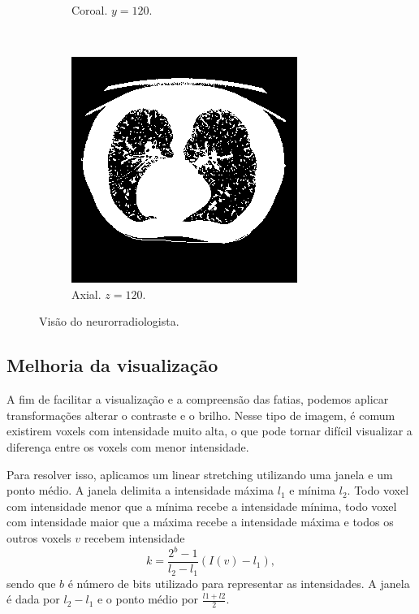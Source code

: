 \documentclass{article}
\begin{document}
\begin{figure}[H]
\begin{subfigure}[b]{0.3\textwidth}
        \caption{Coroal. $y=120$.}
    \end{subfigure}
    ~
    \begin{subfigure}[b]{0.3\textwidth}
        \includegraphics[width=\textwidth]{thorax/neuroradiologist-axial-gray.png}
        \caption{Axial. $z=120$.}
    \end{subfigure}
    \caption{Visão do neurorradiologista.}
    \label{fig:visao-neurorradiologista}
\end{figure}

\subsection{Melhoria da visualização}
A fim de facilitar a visualização e a compreensão das fatias, podemos aplicar transformações alterar o contraste e o brilho. Nesse tipo de imagem, é comum existirem voxels com intensidade muito alta, o que pode tornar difícil visualizar a diferença entre os voxels com menor intensidade.
 
Para resolver isso, aplicamos um linear stretching utilizando uma janela e um ponto médio. A janela delimita a intensidade máxima $l_1$ e mínima $l_2$. Todo voxel com intensidade menor que a mínima recebe a intensidade mínima, todo voxel com intensidade maior que a máxima recebe a intensidade máxima e todos os outros voxels $v$ recebem intensidade \[k = \frac{2^b -1}{l_2 - l_1} (I(v) - l_1), \] sendo que $b$ é número de bits utilizado para representar as intensidades. A janela é dada por $l_2 -l_1$ e o ponto médio por $\frac{l1 + l2}{2}$.
 
\end{document}
